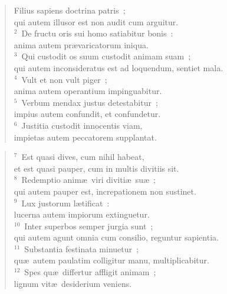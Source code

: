 \begin{flushleft}\begin{verse}\vspace{-19pt}\hspace{6pt}Filius sapiens doctrina patris~;\\\hspace{6pt} qui autem illusor est non audit cum arguitur.\\
${}^{2}$~De fructu oris sui homo satiabitur bonis~:\\ anima autem pr\ae varicatorum iniqua.\\
${}^{3}$~Qui custodit os suum custodit animam suam~;\\ qui autem inconsideratus est ad loquendum, sentiet mala.\\
${}^{4}$~Vult et non vult piger~;\\ anima autem operantium impinguabitur.\\
${}^{5}$~Verbum mendax justus detestabitur~;\\ impius autem confundit, et confundetur.\\
${}^{6}$~Justitia custodit innocentis viam,\\ impietas autem peccatorem supplantat.\end{verse}\end{flushleft}


\begin{flushleft}\begin{verse}${}^{7}$~Est quasi dives, cum nihil habeat,\\ et est quasi pauper, cum in multis divitiis sit.\\
${}^{8}$~Redemptio anim\ae\ viri diviti\ae\ su\ae~;\\ qui autem pauper est, increpationem non sustinet.\\
${}^{9}$~Lux justorum l\ae tificat~:\\ lucerna autem impiorum extinguetur.\\
${}^{10}$~Inter superbos semper jurgia sunt~;\\ qui autem agunt omnia cum consilio, reguntur sapientia.\\
${}^{11}$~Substantia festinata minuetur~;\\ qu\ae\ autem paulatim colligitur manu, multiplicabitur.\\
${}^{12}$~Spes qu\ae\ differtur affligit animam~;\\ lignum vit\ae\ desiderium veniens.\end{verse}\end{flushleft}


